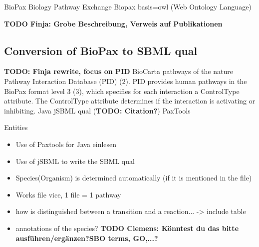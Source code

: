 \documentclass{bioinfo}
\begin{document}
\begin{methods}
BioPax Biology Pathway Exchange \citep{Demir2010}
Biopax basis=owl (Web Ontology Language)


\textbf{TODO Finja: Grobe Beschreibung, Verweis auf Publikationen}

\subsection{Conversion of BioPax to SBML qual}
\textbf{TODO: Finja rewrite, focus on PID}
 BioCarta pathways of the nature Pathway Interaction Database (PID) (2). PID provides human pathways in the BioPax format level 3 (3), which specifies for each interaction a ControlType attribute. The ControlType attribute determines if the interaction is activating or inhibiting.
Java
jSBML \citep{Draeger2011}
qual (\textbf{TODO: Citation?})
PaxTools


Entities 

\begin{itemize}
\item Use of Paxtools for Java einlesen
\item Use of jSBML to write the SBML qual
\item Species(Organism) is determined automatically (if it is mentioned in the file)
\item Works file vice, 1 file = 1 pathway
\item how is distinguished between a transition and a reaction... -> include table
\item annotations of the species? \textbf{TODO Clemens: K\"onntest du das bitte ausf\"uhren/erg\"anzen?SBO terms, GO,...?}
\end{itemize}



\end{methods}
\end{document}

